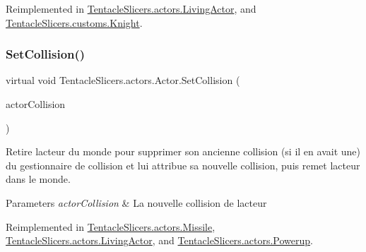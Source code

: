 Reimplemented in \hyperlink{class_tentacle_slicers_1_1actors_1_1_living_actor_a7a2b73efca826044f8d15bdc94e13cf7}{Tentacle\+Slicers.\+actors.\+Living\+Actor}, and \hyperlink{class_tentacle_slicers_1_1customs_1_1_knight_a32666ab0b1401a669d4c32237c310c3e}{Tentacle\+Slicers.\+customs.\+Knight}.

\mbox{\label{class_tentacle_slicers_1_1actors_1_1_actor_a6e1eab5bc50ecb03842f49d0dc3b136e}} 
\subsubsection{\texorpdfstring{Set\+Collision()}{SetCollision()}}
{\footnotesize\ttfamily virtual void Tentacle\+Slicers.\+actors.\+Actor.\+Set\+Collision (\begin{DoxyParamCaption}\item[{\hyperlink{class_tentacle_slicers_1_1collisions_1_1_actor_collision}{Actor\+Collision}}]{actor\+Collision }\end{DoxyParamCaption})\hspace{0.3cm}{\ttfamily [virtual]}}



Retire l\textquotesingle{}acteur du monde pour supprimer son ancienne collision (si il en avait une) du gestionnaire de collision et lui attribue sa nouvelle collision, puis remet l\textquotesingle{}acteur dans le monde. 


\begin{DoxyParams}{Parameters}
{\em actor\+Collision} & La nouvelle collision de l\textquotesingle{}acteur \\
\hline
\end{DoxyParams}


Reimplemented in \hyperlink{class_tentacle_slicers_1_1actors_1_1_missile_a978a6d6f78b7059b86747b9fbaf7f9fc}{Tentacle\+Slicers.\+actors.\+Missile}, \hyperlink{class_tentacle_slicers_1_1actors_1_1_living_actor_ac5f070aa8e36c2815070a654a242b9ef}{Tentacle\+Slicers.\+actors.\+Living\+Actor}, and \hyperlink{class_tentacle_slicers_1_1actors_1_1_powerup_aed821572dc4831af53c26150736986d5}{Tentacle\+Slicers.\+actors.\+Powerup}.

\mbox{\label{class_tentacle_slicers_1_1actors_1_1_actor_a83e7b818449b5e92e3a7003c0cc6f571}} 
